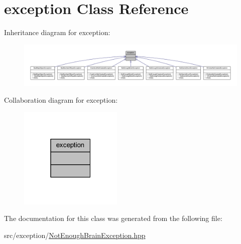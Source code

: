\hypertarget{classexception}{}\section{exception Class Reference}
\label{classexception}


Inheritance diagram for exception\+:\nopagebreak
\begin{figure}[H]
\begin{center}
\leavevmode
\includegraphics[width=350pt]{classexception__inherit__graph}
\end{center}
\end{figure}


Collaboration diagram for exception\+:\nopagebreak
\begin{figure}[H]
\begin{center}
\leavevmode
\includegraphics[width=139pt]{classexception__coll__graph}
\end{center}
\end{figure}


The documentation for this class was generated from the following file\+:\begin{DoxyCompactItemize}
\item 
src/exception/\hyperlink{_not_enough_brain_exception_8hpp}{Not\+Enough\+Brain\+Exception.\+hpp}\end{DoxyCompactItemize}
